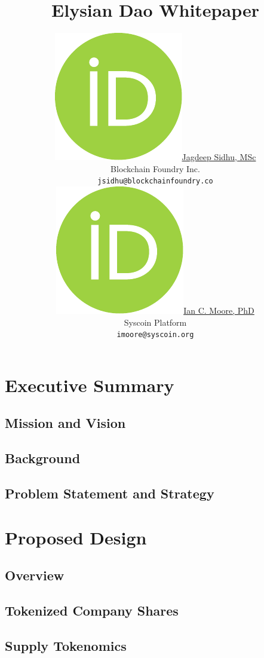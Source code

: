 \documentclass{article}
\title{Elysian Dao Whitepaper}
\author{


	\href{https://orcid.org/0000-0000-0000-0000}{\includegraphics[scale=0.06]{orcid.pdf}\hspace{1mm}Jagdeep Sidhu, MSc} \\
	Blockchain Foundry Inc.\\
	\texttt{jsidhu@blockchainfoundry.co} \\
\And
 \href{https://orcid.org/0000-0000-0000-0000}{\includegraphics[scale=0.06]{orcid.pdf}\hspace{1mm}Ian C. Moore, PhD}\\
	Syscoin Platform\\
	\texttt{imoore@syscoin.org} \\		
}
\begin{document}
\maketitle

\begin{abstract}

\lipsum[1-1]

\end{abstract}


\section{Executive Summary}

\subsection{Mission and Vision}

\lipsum[1-1]

\subsection{Background}

\lipsum[1-1]

\subsection{Problem Statement and Strategy}

\lipsum[1-1]
 


\section{Proposed Design}

\subsection{Overview}

\lipsum[1-1]

\subsection{Tokenized Company Shares}

\lipsum[1-1]

\subsection{Supply Tokenomics}
\label{section:token_model}
\end{document}
